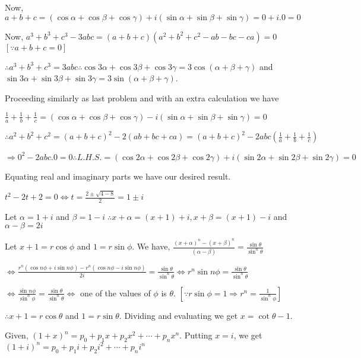   Now, $a + b + c = (\cos\alpha + \cos\beta + \cos\gamma) + i(\sin\alpha + \sin\beta + \sin\gamma) = 0 +
  i.0 = 0$

  Now, $a^3 + b^3 + c^3 - 3abc = (a + b + c)(a^2 + b^2 + c^2 - ab - bc - ca) = 0$ $[\because a + b + c = 0]$

  $\therefore a^3 + b^3 + c^3 = 3abc\therefore \cos3\alpha + \cos3\beta + \cos3\gamma = 3\cos(\alpha +
  \beta + \gamma)$ and $\sin3\alpha + \sin3\beta + \sin3\gamma = 3\sin(\alpha + \beta + \gamma)$.
\item Proceeding similarly as last problem and with an extra calculation we have

  $\frac{1}{a} + \frac{1}{b} + \frac{1}{c} = (\cos\alpha + \cos\beta + \cos\gamma) - i(\sin\alpha +
  \sin\beta + \sin\gamma) = 0$

  $\therefore a^2 + b^2 + c^2 = (a + b + c)^2 - 2(ab + bc + ca) = (a + b + c)^2 - 2 abc\left(\frac{1}{a} +
  \frac{1}{b} + \frac{1}{c}\right)$

  $\Rightarrow 0^2 - 2abc.0 = 0\therefore L.H.S. = (\cos2\alpha + \cos2\beta + \cos2\gamma) + i(\sin2\alpha
  + \sin2\beta + \sin2\gamma) = 0$

  Equating real and imaginary parts we have our desired result.
\item $t^2 -2t + 2 = 0 \Leftrightarrow t = \frac{2 \pm \sqrt{4 - 8}}{2} = 1 \pm i$

  Let $\alpha = 1+ i$ and $\beta = 1 - i\;\therefore x + \alpha = (x + 1) + i, x + \beta = (x + 1) - i$
  and $\alpha - \beta = 2i$

  Let $x + 1 = r\cos\phi$ and $1 = r\sin\phi$. We have, $\frac{(x + \alpha)^n - (x + \beta)^n}{(\alpha -
    \beta)} = \frac{\sin\theta}{\sin^n\theta}$

 $ \Leftrightarrow \frac{r^n(\cos n\phi + i \sin n\phi) - r^n(\cos n\phi - i\sin n\phi)}{2i} =
  \frac{\sin\theta}{\sin^n\theta} \Leftrightarrow r^n \sin n\phi = \frac{\sin\theta}{\sin^n\theta}$

  $\Leftrightarrow \frac{\sin n\phi}{\sin^n\phi} = \frac{\sin\theta}{\sin^n\theta} \Leftrightarrow$ one of
  the values of $\phi$ is $\theta$. $\left[\because r\sin\phi = 1\Rightarrow r^n =
    \frac{1}{\sin^n\phi}\right]$

  $\therefore x + 1 = r \cos\theta$ and $1 = r \sin\theta$. Dividing and evaluating we get $x = \cot\theta -
  1$.
\item Given, $(1 + x)^n = p_0 + p_1x + p_2x^2 + \cdots + p_nx^n$. Putting $x = i$, we get $(1 + i)^n = p_0 + p_1i + p_2i^2 + \cdots + p_ni^n$

